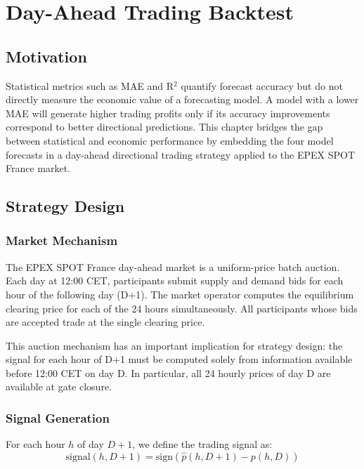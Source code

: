 \chapter{Day-Ahead Trading Backtest}
\label{chap:backtest}

\section{Motivation}

Statistical metrics such as MAE and R$^2$ quantify forecast accuracy but do not directly measure the economic value of a forecasting model. A model with a lower MAE will generate higher trading profits only if its accuracy improvements correspond to better directional predictions. This chapter bridges the gap between statistical and economic performance by embedding the four model forecasts in a day-ahead directional trading strategy applied to the EPEX SPOT France market.

\section{Strategy Design}

\subsection{Market Mechanism}

The EPEX SPOT France day-ahead market is a uniform-price batch auction. Each day at 12:00 CET, participants submit supply and demand bids for each hour of the following day (D+1). The market operator computes the equilibrium clearing price for each of the 24 hours simultaneously. All participants whose bids are accepted trade at the single clearing price.

This auction mechanism has an important implication for strategy design: the signal for each hour of D+1 must be computed solely from information available before 12:00 CET on day D. In particular, all 24 hourly prices of day D are available at gate closure.

\subsection{Signal Generation}

For each hour $h$ of day $D+1$, we define the trading signal as:
\begin{equation}
  \text{signal}(h, D+1) = \text{sign}\!\left(\hat{p}(h, D+1) - p(h, D)\right)
  \label{eq:signal}
\end{equation}

